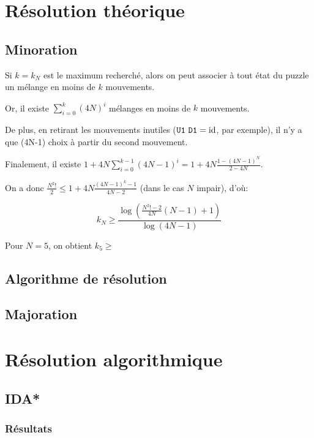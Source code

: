 \documentclass[a4paper, 12pt]{article}
\begin{document}
	\section{Résolution théorique}
	\subsection{Minoration}
		Si $k=k_N$ est le maximum recherché, alors on peut associer à tout état du puzzle un mélange en moins de $k$ mouvements.
		
		Or, il existe $\displaystyle \sum_{i=0}^k (4N)^i$ mélanges en moins de $k$ mouvements.
		
		De plus, en retirant les mouvements inutiles ($\mathtt{U1\ D1} = \mathrm{id}$, par exemple), il n'y a que (4N-1) choix à partir du second mouvement.
		
		Finalement, il existe $\displaystyle 1 + 4N\sum_{i=0}^{k-1}(4N-1)^i = 1+4N\frac{1-(4N-1)^N}{2-4N}$.
		
		On a donc $\frac{N^2!}2 \leqslant 1+4N\frac{(4N-1)^k-1}{4N-2}$ (dans le cas $N$ impair), d'où:
		
		$$k_N \geqslant \frac{\log\left(\frac{N^2!-2}{4N}(N-1)+1\right)}{\log(4N-1)}$$
		
		Pour $N=5$, on obtient $k_5\geqslant$
	\subsection{Algorithme de résolution}
	\subsection{Majoration}
	
	\section{Résolution algorithmique}
	\subsection{IDA*}
	\subsubsection*{Résultats}
				\begin{center}
		\end{center}
		
\end{document}
